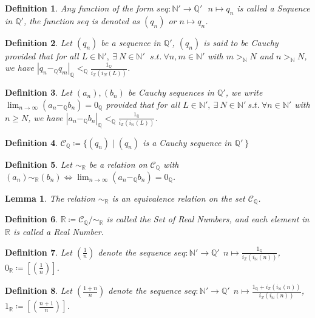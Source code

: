 \documentclass[11pt]{article}
\theoremstyle{break}
\theoremstyle{break}
\newtheorem{lem}{Lemma}[thm]
\newtheorem{defn}{Definition}[corL]
\newcommand{\R}{\mathbb{R}}
\newcommand{\N}{\mathbb{N}}
\newcommand{\Z}{\mathbb{Z}}
\newcommand{\Q}{\mathbb{Q}}
\newcommand{\C}{\mathcal{C}}
\begin{document}
	\begin{defn}
		Any function of the form $seq:\N' \to \Q' \ \ \ n \mapsto q_n$ is called a Sequence in $\Q'$, the function $seq$ is denoted as $(q_n)$ or $n \mapsto q_n$.
	\end{defn}
	
	\begin{defn}
		Let $(q_n)$ be a sequence in $\Q'$, $(q_n)$ is said to be Cauchy provided that for all \mbox{$L \in \N', \ \exists \ N \in \N'$} $\ s.t. \ \forall n,m \in \N'$ with $m >_\N N$ and $n >_\N N$, we have $|q_n -_\Q q_m|_{\Q} <_{\Q} \frac{1_\Q}{i_\Z (i_N (L))}$.
	\end{defn} 
	
	\begin{defn}
		Let $(a_n),(b_n)$ be Cauchy sequences in $\Q'$, we write $\lim_{n \to \infty}(a_n -_\Q b_n)=0_{\Q}$ provided that for all $L \in \N', \ \exists \ N \in \N' \ s.t. \ \forall n \in \N'$ with $n \geq N$, we have $|a_n -_\Q b_n |_{\Q} <_{\Q} \frac{1_\Q}{i_\Z (i_\N (L))}$.
	\end{defn}
	
	\begin{defn}
		$\C_{\Q} \coloneqq \{ (q_n) \mid (q_n)$ is a Cauchy sequence in $\Q' \ \}$
	\end{defn}	
	
	\begin{defn}
		Let $\sim_{\R}$ be a relation on $\C_{\Q}$ with $(a_n) \sim_{\R} (b_n) \iff \lim_{n \to \infty}(a_n -_\Q b_n)=0_{\Q}$.
	\end{defn}
	
	\begin{lem}
		The relation $\sim_{\R}$ is an equivalence relation on the set $\C_{\Q}$.
	\end{lem}
	
	\begin{defn}	
		$\R \coloneqq \C_{\Q}/{\sim_{\R}}$ is called the Set of Real Numbers, and each element in $\R$ is called a Real Number.
	\end{defn}		
		
	\begin{defn}
		Let $(\frac{1}{n})$ denote the sequence $seq: \N' \to \Q' \ \ n \mapsto \frac{1_{\Q}}{i_{\Z}(i_{\N}(n))}$, $0_{\R} \coloneqq [(\frac{1}{n})]$.
	\end{defn}
	
	\begin{defn}
		Let $(\frac{1+n}{n})$ denote the sequence $seq: \N' \to \Q' \ \ n \mapsto \frac{1_{\Q}+i_{\Z}(i_{\N}(n))}{i_{\Z}(i_{\N}(n))}$, $1_{\R} \coloneqq [(\frac{n+1}{n})]$.
	\end{defn}
	
\end{document}
